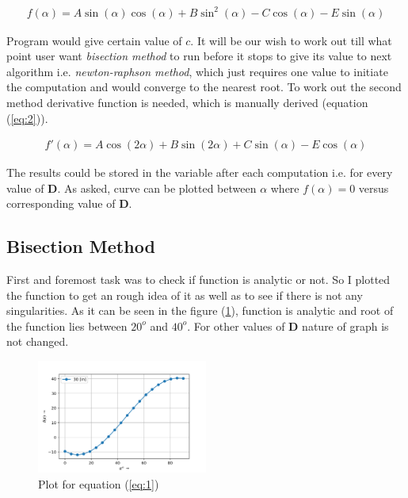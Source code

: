 \documentclass[11pt,a4paper]{article}
\begin{document}
\begin{align} \label{eq:1}
f(\alpha) = A\sin(\alpha)\cos(\alpha) + B\sin^2(\alpha) - C\cos(\alpha) - E\sin(\alpha)
\end{align}

Program would give certain value of $c$. It will be our wish to work out till what point user want \textit{bisection method} to run before it stops to give its value to next algorithm i.e. \textit{newton-raphson method}, which just requires one value to initiate the computation and would converge to the nearest root. To work out the second method derivative function is needed, which is manually derived (equation (\ref{eq:2})).

\begin{align} \label{eq:2}
f'(\alpha) = A\cos(2\alpha) + B\sin(2\alpha) + C\sin(\alpha) - E\cos(\alpha)
\end{align}

The results could be stored in the variable after each computation i.e. for every value of \textbf{D}. As asked, curve can be plotted between $\alpha$  where $f(\alpha) = 0$ versus corresponding value of \textbf{D}.

\subsection*{Bisection Method}

First and foremost task was to check if function is analytic or not. So I plotted the function to get an rough idea of it as well as to see if there is not any singularities. As it can be seen in the figure (\ref{fig:2}), function is analytic and root of the function lies between $20^o$ and $40^o$. For other values of \textbf{D} nature of graph is not changed.

	\begin{figure}[H]	
	\begin{center}
	\includegraphics[width=0.5\textwidth]{func_1.png}
	\caption{Plot for equation (\ref{eq:1})}
	\label{fig:2}	
	\end{center}
	\end{figure}
\end{document}
